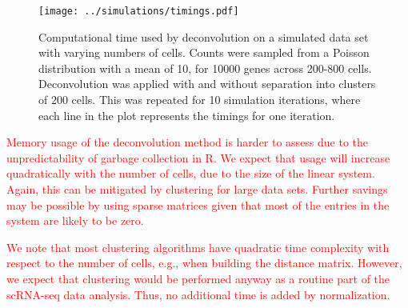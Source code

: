 \documentclass{article}
\newcommand\revised[1]{\textcolor{red}{#1}}
\begin{document}
\begin{figure}[btp]
    \begin{center}
        \texttt{[image: ../simulations/timings.pdf]}
    \end{center}
    \caption{
        Computational time used by deconvolution on a simulated data set with varying numbers of cells.
        Counts were sampled from a Poisson distribution with a mean of 10, for 10000 genes across 200-800 cells.
        Deconvolution was applied with and without separation into clusters of 200 cells.
        This was repeated for 10 simulation iterations, where each line in the plot represents the timings for one iteration.
    }
    \label{fig:timings}
\end{figure}

\revised{Memory usage of the deconvolution method is harder to assess due to the unpredictability of garbage collection in R.
We expect that usage will increase quadratically with the number of cells, due to the size of the linear system.
Again, this can be mitigated by clustering for large data sets.
Further savings may be possible by using sparse matrices given that most of the entries in the system are likely to be zero.}

\revised{We note that most clustering algorithms have quadratic time complexity with respect to the number of cells, e.g., when building the distance matrix.
However, we expect that clustering would be performed anyway as a routine part of the scRNA-seq data analysis.
Thus, no additional time is added by normalization.}
   
\end{document}
